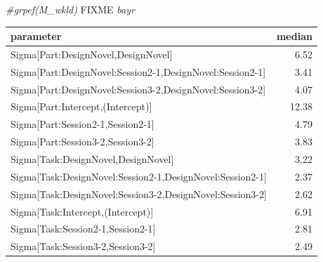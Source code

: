 \documentclass[]{svmono}
\newenvironment{Shaded}{\begin{snugshade}}{\end{snugshade}}
\newcommand{\KeywordTok}[1]{\textcolor[rgb]{0.13,0.29,0.53}{\textbf{#1}}}
\newcommand{\DataTypeTok}[1]{\textcolor[rgb]{0.13,0.29,0.53}{#1}}
\newcommand{\StringTok}[1]{\textcolor[rgb]{0.31,0.60,0.02}{#1}}
\newcommand{\CommentTok}[1]{\textcolor[rgb]{0.56,0.35,0.01}{\textit{#1}}}
\newcommand{\OperatorTok}[1]{\textcolor[rgb]{0.81,0.36,0.00}{\textbf{#1}}}
\newcommand{\AlertTok}[1]{\textcolor[rgb]{0.94,0.16,0.16}{#1}}
\newcommand{\NormalTok}[1]{#1}
\theoremstyle{definition}
\theoremstyle{definition}
\theoremstyle{definition}
\theoremstyle{remark}
\begin{document}
\begin{Shaded}
\begin{Highlighting}[]
\CommentTok{#grpef(M_wkld) }\AlertTok{FIXME}\CommentTok{ bayr}
\end{Highlighting}
\end{Shaded}

\begin{Shaded}
\end{Shaded}

\begin{tabular}{l|r}
\hline
parameter & median\\
\hline
Sigma[Part:DesignNovel,DesignNovel] & 6.52\\
\hline
Sigma[Part:DesignNovel:Session2-1,DesignNovel:Session2-1] & 3.41\\
\hline
Sigma[Part:DesignNovel:Session3-2,DesignNovel:Session3-2] & 4.07\\
\hline
Sigma[Part:Intercept,(Intercept)] & 12.38\\
\hline
Sigma[Part:Session2-1,Session2-1] & 4.79\\
\hline
Sigma[Part:Session3-2,Session3-2] & 3.83\\
\hline
Sigma[Task:DesignNovel,DesignNovel] & 3.22\\
\hline
Sigma[Task:DesignNovel:Session2-1,DesignNovel:Session2-1] & 2.37\\
\hline
Sigma[Task:DesignNovel:Session3-2,DesignNovel:Session3-2] & 2.62\\
\hline
Sigma[Task:Intercept,(Intercept)] & 6.91\\
\hline
Sigma[Task:Session2-1,Session2-1] & 2.81\\
\hline
Sigma[Task:Session3-2,Session3-2] & 2.49\\
\hline
\end{tabular}
\end{document}
